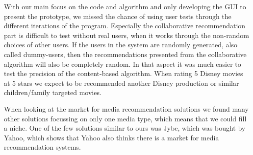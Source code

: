 With our main focus on the code and algorithm and only developing the GUI to present the prototype, we missed the chance of using user tests through the different iterations of the program. Especially the collaborative recommendation part is difficult to test without real users, when it works through the non-random choices of other users. If the users in the system are randomly generated, also called dummy-users, then the recommendations presented from the collaborative algorithm will also be completely random. In that aspect it was much easier to test the precision of the content-based algorithm. When rating 5 Disney movies at 5 stars we expect to be recommended another Disney production or similar children/family targeted movies.

When looking at the market for media recommendation solutions we found many other solutions focussing on only one media type, which means that we could fill a niche. One of the few solutions similar to ours was Jybe, which was bought by Yahoo, which shows that Yahoo also thinks there is a market for media recommendation systems. \cite{Jybe}